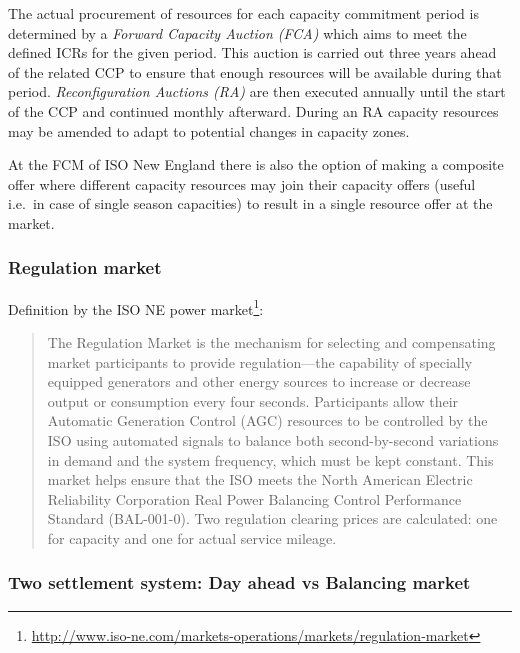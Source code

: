 The actual procurement of resources for each capacity commitment period is determined by a \emph{Forward Capacity Auction (FCA)} which aims to meet the defined ICRs for the given period.
This auction is carried out three years ahead of the related CCP to ensure that enough resources will be available during that period. \emph{Reconfiguration Auctions (RA)} are then executed annually until the start of the CCP and continued monthly afterward. During an RA capacity resources may be amended to adapt to potential changes in capacity zones. 

At the FCM of ISO New England there is also the option of making a composite offer where different capacity resources may join their capacity offers (useful i.e.~in case of single season capacities) to result in a single resource offer at the market. 



\subsubsection{Regulation market}

Definition by the ISO NE power market\footnote{\url{http://www.iso-ne.com/markets-operations/markets/regulation-market}}:

\begin{quote}
The Regulation Market is the mechanism for selecting and compensating market participants to provide regulation—the capability of specially equipped generators and other energy sources to increase or decrease output or consumption every four seconds. Participants allow their Automatic Generation Control (AGC) resources to be controlled by the ISO using automated signals to balance both second-by-second variations in demand and the system frequency, which must be kept constant. This market helps ensure that the ISO meets the North American Electric Reliability Corporation Real Power Balancing Control Performance Standard (BAL-001-0). Two regulation clearing prices are calculated: one for capacity and one for actual service mileage.
\end{quote}




\subsubsection{Two settlement system: Day ahead vs Balancing market}

